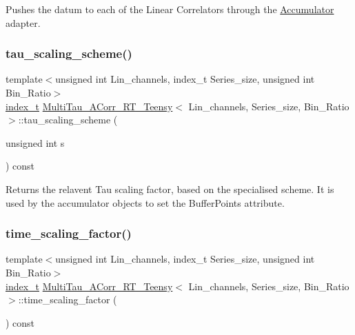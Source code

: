 Pushes the datum to each of the Linear Correlators through the \hyperlink{classAccumulator}{Accumulator} adapter. 

\mbox{\label{classMultiTau__ACorr__RT__Teensy_af90bc219b8b9dc316c56efd7c74aae6f}} 
\subsubsection{\texorpdfstring{tau\+\_\+scaling\+\_\+scheme()}{tau\_scaling\_scheme()}}
{\footnotesize\ttfamily template$<$unsigned int Lin\+\_\+channels, index\+\_\+t Series\+\_\+size, unsigned int Bin\+\_\+\+Ratio$>$ \\
\hyperlink{types_8hpp_a7c40bb931c31595ed6308605f4537447}{index\+\_\+t} \hyperlink{classMultiTau__ACorr__RT__Teensy}{Multi\+Tau\+\_\+\+A\+Corr\+\_\+\+R\+T\+\_\+\+Teensy}$<$ Lin\+\_\+channels, Series\+\_\+size, Bin\+\_\+\+Ratio $>$\+::tau\+\_\+scaling\+\_\+scheme (\begin{DoxyParamCaption}\item[{unsigned int}]{s }\end{DoxyParamCaption}) const\hspace{0.3cm}{\ttfamily [inline]}}



Returns the relavent Tau scaling factor, based on the specialised scheme. It is used by the accumulator objects to set the Buffer\+Points attribute. 

\mbox{\label{classMultiTau__ACorr__RT__Teensy_a218fdc2fcc3bb7cd5d1c2f03ea2506da}} 
\subsubsection{\texorpdfstring{time\+\_\+scaling\+\_\+factor()}{time\_scaling\_factor()}}
{\footnotesize\ttfamily template$<$unsigned int Lin\+\_\+channels, index\+\_\+t Series\+\_\+size, unsigned int Bin\+\_\+\+Ratio$>$ \\
\hyperlink{types_8hpp_a7c40bb931c31595ed6308605f4537447}{index\+\_\+t} \hyperlink{classMultiTau__ACorr__RT__Teensy}{Multi\+Tau\+\_\+\+A\+Corr\+\_\+\+R\+T\+\_\+\+Teensy}$<$ Lin\+\_\+channels, Series\+\_\+size, Bin\+\_\+\+Ratio $>$\+::time\+\_\+scaling\+\_\+factor (\begin{DoxyParamCaption}{ }\end{DoxyParamCaption}) const\hspace{0.3cm}{\ttfamily [inline]}}

